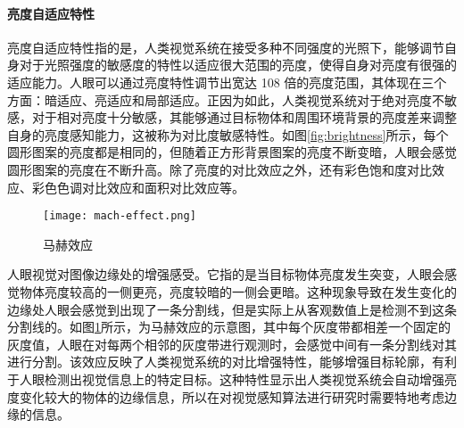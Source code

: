   \paragraph{亮度自适应特性} 亮度自适应特性指的是，人类视觉系统在接受多种不同强度的光照下，能够调节自身对于光照强度的敏感度的特性以适应很大范围的亮度，使得自身对亮度有很强的适应能力。人眼可以通过亮度特性调节出宽达 108 倍的亮度范围，其体现在三个方面：暗适应、亮适应和局部适应。正因为如此，人类视觉系统对于绝对亮度不敏感，对于相对亮度十分敏感，其能够通过目标物体和周围环境背景的亮度差来调整自身的亮度感知能力，这被称为对比度敏感特性。如图\ref{fig:brightness}所示，每个圆形图案的亮度都是相同的，但随着正方形背景图案的亮度不断变暗，人眼会感觉圆形图案的亮度在不断升高。除了亮度的对比效应之外，还有彩色饱和度对比效应、彩色色调对比效应和面积对比效应等。

  \begin{figure}[!htp]
    \centering
    \texttt{[image: mach-effect.png]}
    \caption{马赫效应}
  \label{fig:mach}
  \end{figure}

  人眼视觉对图像边缘处的增强感受。它指的是当目标物体亮度发生突变，人眼会感觉物体亮度较高的一侧更亮，亮度较暗的一侧会更暗。这种现象导致在发生变化的边缘处人眼会感觉到出现了一条分割线，但是实际上从客观数值上是检测不到这条分割线的。如图\ref{fig:mach}所示，为马赫效应的示意图，其中每个灰度带都相差一个固定的灰度值，人眼在对每两个相邻的灰度带进行观测时，会感觉中间有一条分割线对其进行分割。该效应反映了人类视觉系统的对比增强特性，能够增强目标轮廓，有利于人眼检测出视觉信息上的特定目标。这种特性显示出人类视觉系统会自动增强亮度变化较大的物体的边缘信息，所以在对视觉感知算法进行研究时需要特地考虑边缘的信息。


